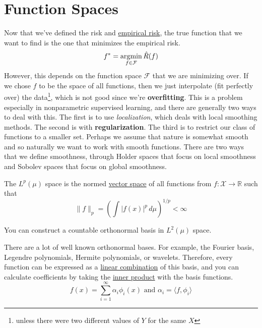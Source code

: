 \section{Function Spaces}

  Now that we've defined the risk and \hyperref[def:empirical-risk]{empirical risk}, the true function that we want to find is the one that minimizes the empirical risk. 
  \begin{equation}
    f^\ast = \operatorname*{\arg\!\min}_{f \in \mathcal{F}} \hat{R} (f)
  \end{equation}
  However, this depends on the function space $\mathcal{F}$ that we are minimizing over. If we chose $f$ to be the space of all functions, then we just interpolate (fit perfectly over) the data\footnote{unless there were two different values of $Y$ for the same $X$}, which is not good since we're \textbf{overfitting}. This is a problem especially in nonparametric supervised learning, and there are generally two ways to deal with this. The first is to use \textit{localization}, which deals with local smoothing methods. The second is with \textbf{regularization}. The third is to restrict our class of functions to a smaller set. Perhaps we assume that nature is somewhat smooth and so naturally we want to work with smooth functions. There are two ways that we define smoothness, through Holder spaces that focus on local smoothness and Sobolev spaces that focus on global smoothness. 

  \begin{definition}[$L^p$ Space]
    \label{def:lp-space}
    The $L^p (\mu)$ space is the normed \hyperref[lin-def:vector-space]{vector space} of all functions from $f: \mathcal{X} \rightarrow \mathbb{R}$ such that 
    \begin{equation}
      \|f\|_p = \left( \int |f(x)|^p \,d\mu \right)^{1/p} < \infty
    \end{equation}
  \end{definition}

  \begin{theorem}
    \label{thm:countable-basis}
    You can construct a countable orthonormal basis in $L^2 (\mu)$ space. 
  \end{theorem}

  There are a lot of well known orthonormal bases. For example, the Fourier basis, Legendre polynomials, Hermite polynomials, or wavelets. Therefore, every function can be expressed as a \hyperref[lin-def:linear-combination]{linear combination} of this basis, and you can calculate coefficients by taking the \hyperref[lin-def:inner-product]{inner product} with the basis functions. 
  \begin{equation}
    f(x) = \sum_{i=1}^\infty \alpha_i \phi_i (x) \text{ and } \alpha_i = \langle f, \phi_i \rangle
  \end{equation}

